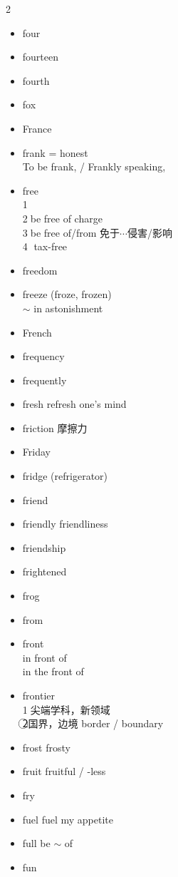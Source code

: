 \documentclass[../../book.tex]{subfiles}
\begin{document}
\begin{multicols}{2}
\begin{itemize}
\item[-] four
\item[-] fourteen
\item[-] fourth
\item[-] fox
\item[-] France
\item[-] frank = honest
\\To be frank, / Frankly speaking,
\item[-] free
\\\textcircled{1}
\\\textcircled{2}be free of charge
\\\textcircled{3}be free of/from 免于$\cdots$侵害/影响
\\\textcircled{4} tax-free
\item[-] freedom
\item[-] freeze (froze, frozen)
\\$\sim$ in astonishment
\item[-] French
\item[-] frequency
\item[-] frequently
\item[-] fresh \phantom{a} refresh one\textquoteright s mind
\item[-] friction 摩擦力
\item[-] Friday
\item[-] fridge (refrigerator)
\item[-] friend
\item[-] friendly \phantom{a} friendliness
\item[-] friendship
\item[-] frightened
\item[-] frog
\item[-] from
\item[-] front
\\in front of
\\in the front of
\item[-] frontier
\\\textcircled{1}尖端学科，新领域
\\\textcircled{2}国界，边境 border / boundary
\item[-] frost \phantom{a} frosty
\item[-] fruit \phantom{a} fruitful / -less
\item[-] fry
\item[-] fuel \phantom{a} fuel my appetite
\item[-] full \phantom{a} be $\sim$ of
\item[-] fun

\end{itemize}
\end{multicols}
\end{document}

